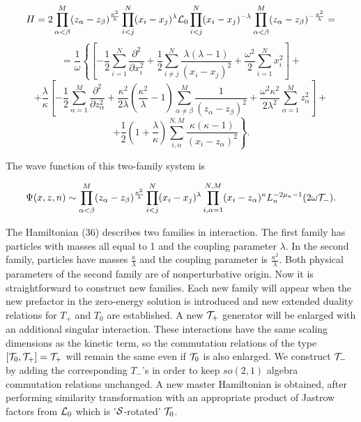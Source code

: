 \documentclass[a4paper,preprint,aps]{revtex4}
\begin{document}
  
\[
H=2 \prod_{\alpha < \beta}^{M} 
 (z_{\alpha}-z_{\beta})^{\frac{\kappa^2}{\lambda}}
\prod_{i < j}^{N}
 (x_{i}-x_{j})^{\lambda}
{\cal L}_{0}
\prod_{i < j}^{N}
 (x_{i}-x_{j})^{-\lambda}
\prod_{\alpha < \beta}^{M}
 (z_{\alpha}-z_{\beta})^{-\frac{\kappa^2}{\lambda}}=
\]
\[=\frac{1}{\omega}
	\left\{
	\left[
	- \frac{1}{2}
	\sum_{i=1}^{N}
		\frac {\partial ^{2}}{\partial x_{i}^2} +
		\frac{1}{2}
	\sum_{i\neq j}^{N}
	 	\frac {\lambda(\lambda-1)}{(x_{i}-x_{j})^{2}} +
		\frac{\omega^{2}}{2}
	\sum_{i=1}^{N}
		x_{i}^2
	\right]+\right.
\]
\[
	+\frac{\lambda}{\kappa}
	\left[
	- \frac{1}{2}
	\sum_{\alpha=1}^{M}
		\frac {\partial ^{2}}{\partial z_{\alpha}^{2}} +
		\frac {\kappa^{2}}{2 \lambda}
		\left(\frac{\kappa^{2}}{\lambda}-1\right)
	\sum_{\alpha \neq \beta}^{M}
	\frac{1}{(z_{\alpha}-z_{\beta})^{2}} +
		\frac{\omega^{2} \kappa^{2}}{2\lambda^2}
	\sum_{\alpha=1}^{M} z_{\alpha}^2
	\right]+
	\]
\begin{equation}
	\left.+
	\frac{1}{2}
	\left(1+\frac{\lambda}{\kappa}\right)
	\sum_{i,\alpha}^{N,M} \frac{\kappa(\kappa-1)}{(x_{i}-z_{\alpha})^2}
	\right\} .
\end{equation} 

The wave function of this two-family system is


\begin{equation}
	\Psi(x,z,n)\sim \prod_{\alpha < \beta}^{M} 
	 (z_{\alpha}-z_{\beta})^{\frac{\kappa^2}{\lambda}}
	\prod_{i < j}^{N} (x_{i}-x_{j})^{\lambda}
	\prod_{i,\alpha=1}^{N,M} (x_{i}-z_{\alpha})^{\kappa}
	L_{n}^{-2\mu_{\kappa}-1}(2\omega{\cal T}_{-}) .
\end{equation}

 The Hamiltonian (36) describes two families in interaction. The first family
 has particles with masses all equal to 1 and the coupling parameter $\lambda$.
In the second family, particles have masses $\frac{\kappa}{\lambda}$ and the
coupling parameter is $\frac{\kappa^2}{\lambda}$. Both physical parameters
 of the second family are of nonperturbative origin. Now it is straightforward
 to construct new families. Each new family will appear when the new prefactor
 in the zero-energy solution is introduced and new extended duality relations 
for $T_{+}$ and $T_{0}$ are established. A new ${\cal T}_{+}$ generator will be
enlarged with an additional singular interaction. These interactions have the 
same scaling dimensions as the kinetic term, so the commutation relations of
 the type $[{\cal T}_{0},{\cal T}_{+}]={\cal T}_{+}$ will remain the same even
if ${\cal T}_{0}$ is also enlarged. We construct ${\cal T}_{-}$ by adding the
 corresponding $T_{-}$'s in order to keep $so(2,1)$ algebra commutation
 relations unchanged. A new master Hamiltonian is obtained, after performing 
similarity transformation with an appropriate product of Jastrow factors from
 ${\cal L}_{0}$ which is '${\cal S}$-rotated' ${\cal T}_{0}$.
\end{document}
